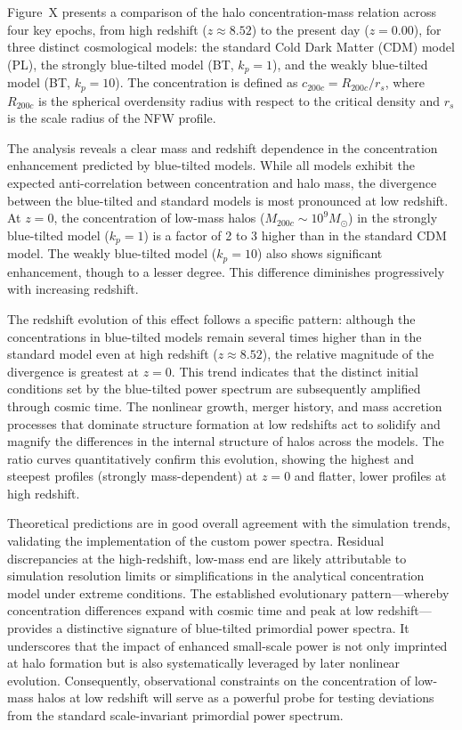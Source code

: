 \documentclass[
 reprint,
 superscriptaddress,
 nofootinbib,
 nobibnotes,
 amsmath,
 amssymb,
 aps,
 prd,
 floatfix,
 longbibliography
]{revtex4-1}
\begin{document}
{{\color{black}Figure~X presents a comparison of the halo concentration-mass relation across four key epochs, from high redshift ($z \approx 8.52$) to the present day ($z = 0.00$), for three distinct cosmological models: the standard Cold Dark Matter (CDM) model (PL), the strongly blue-tilted model (BT, $k_p=1$), and the weakly blue-tilted model (BT, $k_p=10$). The concentration is defined as $c_{200c} = R_{200c} / r_s$, where $R_{200c}$ is the spherical overdensity radius with respect to the critical density and $r_s$ is the scale radius of the NFW profile.

The analysis reveals a clear mass and redshift dependence in the concentration enhancement predicted by blue-tilted models. While all models exhibit the expected anti-correlation between concentration and halo mass, the divergence between the blue-tilted and standard models is most pronounced at low redshift. At $z=0$, the concentration of low-mass halos ($M_{200c} \sim 10^9 M_\odot$) in the strongly blue-tilted model ($k_p=1$) is a factor of 2 to 3 higher than in the standard CDM model. The weakly blue-tilted model ($k_p=10$) also shows significant enhancement, though to a lesser degree. This difference diminishes progressively with increasing redshift.

The redshift evolution of this effect follows a specific pattern: although the concentrations in blue-tilted models remain several times higher than in the standard model even at high redshift ($z \approx 8.52$), the relative magnitude of the divergence is greatest at $z=0$. This trend indicates that the distinct initial conditions set by the blue-tilted power spectrum are subsequently amplified through cosmic time. The nonlinear growth, merger history, and mass accretion processes that dominate structure formation at low redshifts act to solidify and magnify the differences in the internal structure of halos across the models. The ratio curves quantitatively confirm this evolution, showing the highest and steepest profiles (strongly mass-dependent) at $z=0$ and flatter, lower profiles at high redshift.

Theoretical predictions are in good overall agreement with the simulation trends, validating the implementation of the custom power spectra. Residual discrepancies at the high-redshift, low-mass end are likely attributable to simulation resolution limits or simplifications in the analytical concentration model under extreme conditions. The established evolutionary pattern---whereby concentration differences expand with cosmic time and peak at low redshift---provides a distinctive signature of blue-tilted primordial power spectra. It underscores that the impact of enhanced small-scale power is not only imprinted at halo formation but is also systematically leveraged by later nonlinear evolution. Consequently, observational constraints on the concentration of low-mass halos at low redshift will serve as a powerful probe for testing deviations from the standard scale-invariant primordial power spectrum.

}}
\end{document}
